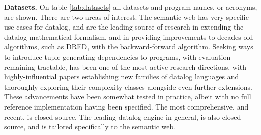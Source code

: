 \documentclass[sigconf,screen,review=false,natbib]{acmart}
\theoremstyle{definition}
\begin{document}
\textbf{Datasets.} On table \ref{tab:datasets} all datasets and program names, or acronyms, are shown. There are two areas of interest. The semantic web has very
specific use-cases for datalog, and are the leading source of research in extending the datalog mathematical formalism, and in providing improvements to decades-old
algorithms, such as DRED, with the backward-forward algorithm\cite{dredbf}. Seeking ways to introduce tuple-generating dependencies to programs, with evaluation remaining
tractable, has been one of the most active research directions, with highly-influential papers establishing new families of datalog languages\cite{datalog_plus_minus} and
thoroughly exploring their complexity classes alongside even further extensions\cite{sticky,warded,monadic}. These advancements have been somewhat tested in practice, albeit
with no full reference implementation having been specified. The most comprehensive, and recent, is closed-source\cite{vadalog}. The leading datalog engine in general, is
also closed-source\cite{rdfox}, and is tailored specifically to the semantic web.
\end{document}
